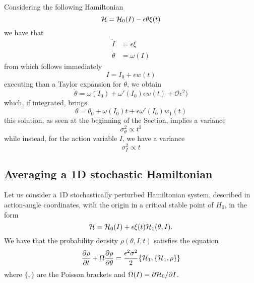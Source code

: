 Considering the following Hamiltonian
\begin{equation}
	\mathcal{H} = \mathcal{H}_0(I) - \epsilon \theta \xi(t)
\end{equation}
we have that
\begin{equation}
	\begin{aligned}
		\dot{I} &= \epsilon\xi \\
		\dot{\theta} &= \omega(I)
	\end{aligned}
\end{equation}
from which follows immediately
\begin{equation}
	I = I_0 + \epsilon w(t)
\end{equation}
executing than a Taylor expansion for \(\dot{\theta}\), we obtain
\begin{equation}
	\dot{\theta} = \omega(I_0) + \omega'(I_0)\epsilon w(t) + \mathcal{O}\epsilon^2)
\end{equation}
which, if integrated, brings
\begin{equation}
	\theta = \theta_0 + \omega(I_0)t + \epsilon \omega'(I_0) w_1(t)
\end{equation}
this solution, as seen at the beginning of the Section, implies a variance
\begin{equation}
	\sigma_{\theta}^2 \propto t^3
\end{equation}
while instead, for the action variable \(I\), we have a variance
\begin{equation}
	\sigma_{I}^2 \propto t
\end{equation}

\subsection{Averaging a 1D stochastic Hamiltonian}
\label{ssc:averaging-1D}

Let us consider a 1D stochastically perturbed Hamiltonian system, described in action-angle coordinates, with the origin in a critical stable point of \(H_0\), in the form
\begin{equation}
	\mathcal{H} = \mathcal{H}_0(I) + \epsilon \xi(t) \mathcal{H}_1(\theta, I).
\end{equation}
We have that the probability density \(\rho(\theta, I, t)\) satisfies the equation
\begin{equation}
	\pdv{\rho}{t}\/ + \Omega \pdv{\rho}{\theta}\/ = \frac{\epsilon^2 \sigma^2}{2}\{\mathcal{H}_1, \{\mathcal{H}_1,\rho\}\}
	\label{eq:stoc_ham_complex_starting}
\end{equation}
where \(\{,\}\) are the Poisson brackets and \(\Omega(I) = \partial \mathcal{H}_0/\partial I\).

